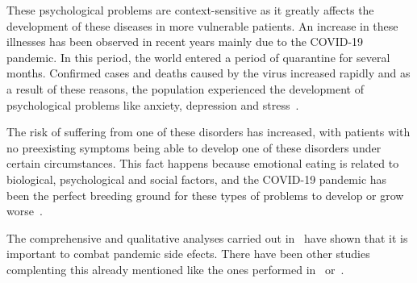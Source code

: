 These psychological problems are context-sensitive as it greatly affects the development of these diseases in more vulnerable patients. An increase in these illnesses has been observed in recent years mainly due to the COVID-19 pandemic. In this period, the world entered a period of quarantine for several months. Confirmed cases and deaths caused by the virus increased rapidly and as a result of these reasons, the population experienced the development of psychological problems like anxiety, depression and stress~\cite{ramirez2021repercusiones}.


The risk of suffering from one of these disorders has increased, with patients with no preexisting symptoms being able to develop one of these disorders under certain circumstances. This fact happens because emotional eating is related to biological, psychological and social factors, and the COVID-19 pandemic has been the perfect breeding ground for these types of problems to develop or grow worse~\cite{dos2022emotional}.





The comprehensive and qualitative analyses carried out in~\cite{touyz2020eating} have shown that it is important to combat pandemic side efects. There have been other studies complenting this already mentioned like the ones performed in~\cite{j2022impact} or~\cite{vall2021impacto}.

